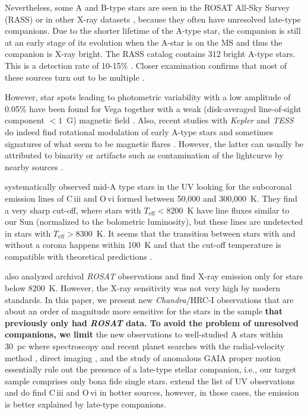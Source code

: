 \documentclass[preprint2]{aastex631}
\begin{document}
Nevertheless, some A and B-type stars  are seen in the ROSAT
All-Sky Survey (RASS) or in other X-ray datasets \citep{2020ApJ...902..114W}, because they often have unresolved late-type
companions. Due to the shorter lifetime of the A-type star, the companion is
still at an early stage of its evolution when the A-star is on the MS and thus the companion is X-ray bright. The RASS
catalog contains 312 bright A-type stars. This is a detection rate of 10-15\% \citep{2007A&A...475..677S}.  Closer examination confirms that most of these sources turn out to be multiple \citep{2000A&A...359..227H,2003A&A...407.1067S}.

However, star spots leading to photometric variability with a low amplitude of 0.05\% have been found for Vega \citep{2015A&A...577A..64B} together with a weak (disk-averaged line-of-sight component $< 1$~G) magnetic field \citep{2009A&A...500L..41L,2010A&A...523A..41P}.
Also, recent studies with \emph{Kepler} and \emph{TESS} do indeed find rotational modulation of early A-type stars \citep{2011MNRAS.415.1691B,2017MNRAS.467.1830B,
2019MNRAS.487.4695S} and sometimes signatures of what seem to be magnetic flares \citep{2012MNRAS.423.3420B}. However, the latter can usually be attributed to binarity or artifacts such as contamination of the lightcurve by nearby sources \citep{2017MNRAS.466.3060P}.

\cite{2002ApJ...579..800S} systematically observed mid-A type stars in the UV
looking for the subcoronal emission lines
of C\,{\sc iii} and O\,{\sc vi} formed between 50,000 and 300,000~K. They find a
very sharp cut-off, where stars with $T_\mathrm{eff}<8200$~K have line fluxes similar to our Sun (normalized to the bolometric
luminosity), but these lines are undetected in stars with $T_\mathrm{eff} > 8300$~K. It seems that the
transition between stars with and without a corona happens within 100~K and that the cut-off temperature is compatible with theoretical predictions \citep{2000ASPC..210..187C,2002MNRAS.330L...6K}.

\citet{2002ApJ...579..800S} also analyzed archival \emph{ROSAT} observations
and find X-ray emission only for stars below 8200~K. However, the X-ray sensitivity was not very high by modern standards. 
In this paper, we present new \emph{Chandra}/HRC-I observations that are about an order of magnitude more sensitive for the stars in the \citet{2002ApJ...579..800S} sample \textbf{that previously only had \emph{ROSAT} data. 
To avoid the problem of unresolved companions, we limit} the new observations to well-studied A stars within 30~pc
where spectroscopy and recent planet searches with the radial-velocity method \citep[e.g.][]{2021AJ....161..157H}, direct imaging \citep[e.g.][]{2013ApJ...776....4N,2017AJ....154..245M}, and the study of anomalous GAIA proper motion \citep{2019A&A...623A..72K} essentially rule out the presence of a late-type stellar companion, i.e., our target sample comprises only bona fide single stars.
\citet{2008ApJ...685..478N} extend the list of UV observations and do find  C\,{\sc iii} and O\,{\sc vi} in hotter sources, however, in those cases, the emission is better explained by late-type companions.
\end{document}
